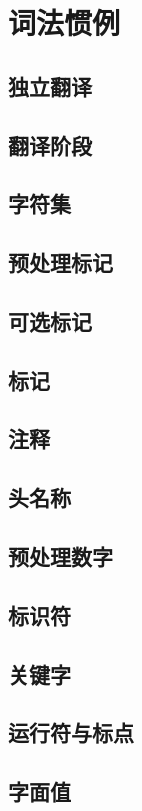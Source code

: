 \chapter{词法惯例}

\section{独立翻译}
\section{翻译阶段}
\section{字符集}
\section{预处理标记}
\section{可选标记}
\section{标记}
\section{注释}
\section{头名称}
\section{预处理数字}
\section{标识符}
\section{关键字}
\section{运行符与标点}
\section{字面值}
